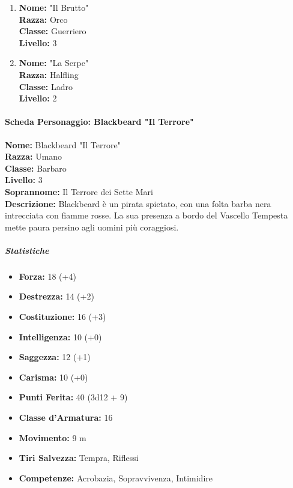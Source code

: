 \documentclass{article}
\begin{document}
\begin{enumerate}
\item \textbf{Nome:} "Il Brutto"\\
  \textbf{Razza:} Orco\\
  \textbf{Classe:} Guerriero\\
  \textbf{Livello:} 3

\item \textbf{Nome:} "La Serpe"\\
  \textbf{Razza:} Halfling\\
  \textbf{Classe:} Ladro\\
  \textbf{Livello:} 2

\end {enumerate}



                  \paragraph*{Scheda Personaggio: Blackbeard "Il Terrore"}

\textbf{Nome:} Blackbeard "Il Terrore" \\
\textbf{Razza:} Umano \\
\textbf{Classe:} Barbaro \\
\textbf{Livello:} 3 \\
\textbf{Soprannome:} Il Terrore dei Sette Mari \\
\textbf{Descrizione:} Blackbeard è un pirata spietato, con una folta barba nera intrecciata con fiamme rosse. La sua presenza a bordo del Vascello Tempesta mette paura persino agli uomini più coraggiosi. 

                      \subparagraph*{Statistiche}

\begin{itemize}
  \item \textbf{Forza:} 18 (+4)
  \item \textbf{Destrezza:} 14 (+2)
  \item \textbf{Costituzione:} 16 (+3)
  \item \textbf{Intelligenza:} 10 (+0)
  \item \textbf{Saggezza:} 12 (+1)
  \item \textbf{Carisma:} 10 (+0)
\end{itemize}

\begin{itemize}
  \item \textbf{Punti Ferita:} 40 (3d12 + 9)
  \item \textbf{Classe d'Armatura:} 16
  \item \textbf{Movimento:} 9 m
  \item \textbf{Tiri Salvezza:} Tempra, Riflessi
  \item \textbf{Competenze:} Acrobazia, Sopravvivenza, Intimidire
\end{itemize}
\end{document}
